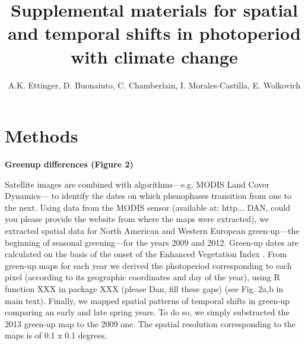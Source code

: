 \documentclass{article}
\begin{document}
 
\title{Supplemental materials for spatial and temporal shifts in photoperiod with climate change} %

\author{A.K. Ettinger, D. Buonaiuto, C. Chamberlain, I. Morales-Castilla, E. Wolkovich}
\maketitle  %


\section*{Methods}
\par \textbf{Greenup differences (Figure 2)}
\par Satellite images are combined with algorithms---e.g. MODIS Land Cover Dynamics--- to identify the dates on which phenophases transition from one to the next. Using data from the MODIS sensor (available at: http... DAN, could you please provide the website from where the maps were extracted), we extracted spatial data for North American and Western European green-up---the beginning of seasonal greening---for the years 2009 and 2012. Green-up dates are calculated on the basis of the onset of the Enhanced Vegetation Index \citep{huete2002overview}. From green-up maps for each year we derived the photoperiod corresponding to each pixel (according to its geographic coordinates and day of the year), using R function XXX in package XXX (please Dan, fill these gaps) (see Fig. 2a,b in main text). Finally, we mapped spatial patterns of temporal shifts in green-up comparing an early and late spring years. To do so, we simply substracted the 2013 green-up map to the 2009 one. The spatial resolution corresponding to the maps is of 0.1 x 0.1 degrees.
\end{document}
